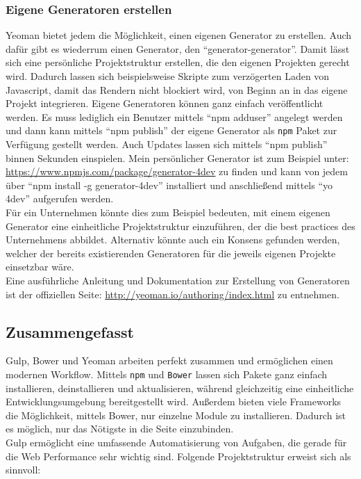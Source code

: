 		\subsubsection{Eigene Generatoren erstellen} %
		\label{ssub:eigene_generatoren_erstellen}
			Yeoman bietet jedem die Möglichkeit, einen eigenen Generator zu erstellen. Auch dafür gibt es wiederrum einen Generator, den "`generator-generator"'. Damit lässt sich eine persönliche Projektstruktur erstellen, die den eigenen Projekten gerecht wird. Dadurch lassen sich beispielsweise Skripte zum verzögerten Laden von Javascript, damit das Rendern nicht blockiert wird, von Beginn an in das eigene Projekt integrieren. Eigene Generatoren können ganz einfach veröffentlicht werden. Es muss lediglich ein Benutzer mittels "`npm adduser"' angelegt werden und dann kann mittels "`npm publish"' der eigene Generator als \texttt{npm} Paket zur Verfügung gestellt werden. Auch Updates lassen sich mittels "`npm publish"' binnen Sekunden einspielen. Mein persönlicher Generator ist zum Beispiel unter: \url{https://www.npmjs.com/package/generator-4dev} zu finden und kann von jedem über "`npm install -g generator-4dev"' installiert und anschließend mittels "`yo 4dev"' aufgerufen werden.\\

			Für ein Unternehmen könnte dies zum Beispiel bedeuten, mit einem eigenen Generator eine einheitliche Projektstruktur einzuführen, der die best practices des Unternehmens abbildet. Alternativ könnte auch ein Konsens gefunden werden, welcher der bereits existierenden Generatoren für die jeweils eigenen Projekte einsetzbar wäre.\\

			Eine ausführliche Anleitung und Dokumentation zur Erstellung von Generatoren ist der offiziellen Seite: \url{http://yeoman.io/authoring/index.html} zu entnehmen.
		
		

	\subsection{Zusammengefasst}
	\label{sub:zusammengefasst}
		Gulp, Bower und Yeoman arbeiten perfekt zusammen und ermöglichen einen modernen Workflow. Mittels \texttt{npm} und \texttt{Bower} lassen sich Pakete ganz einfach installieren, deinstallieren und aktualisieren, während gleichzeitig eine einheitliche Entwicklungsumgebung bereitgestellt wird. Außerdem bieten viele Frameworks die Möglichkeit, mittels Bower, nur einzelne Module zu installieren. Dadurch ist es möglich, nur das Nötigste in die Seite einzubinden.\\ Gulp ermöglicht eine umfassende Automatisierung von Aufgaben, die gerade für die Web Performance sehr wichtig sind. Folgende Projektstruktur erweist sich als sinnvoll:

